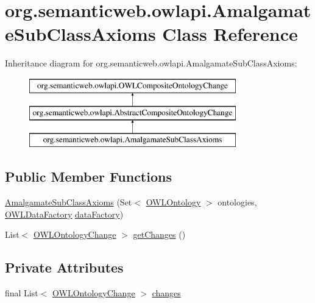 \hypertarget{classorg_1_1semanticweb_1_1owlapi_1_1_amalgamate_sub_class_axioms}{\section{org.\-semanticweb.\-owlapi.\-Amalgamate\-Sub\-Class\-Axioms Class Reference}
\label{classorg_1_1semanticweb_1_1owlapi_1_1_amalgamate_sub_class_axioms}
}
Inheritance diagram for org.\-semanticweb.\-owlapi.\-Amalgamate\-Sub\-Class\-Axioms\-:\begin{figure}[H]
\begin{center}
\leavevmode
\includegraphics[height=3.000000cm]{classorg_1_1semanticweb_1_1owlapi_1_1_amalgamate_sub_class_axioms}
\end{center}
\end{figure}
\subsection*{Public Member Functions}
\begin{DoxyCompactItemize}
\item 
\hyperlink{classorg_1_1semanticweb_1_1owlapi_1_1_amalgamate_sub_class_axioms_afe806c1aa6c20882c377a2e610063697}{Amalgamate\-Sub\-Class\-Axioms} (Set$<$ \hyperlink{interfaceorg_1_1semanticweb_1_1owlapi_1_1model_1_1_o_w_l_ontology}{O\-W\-L\-Ontology} $>$ ontologies, \hyperlink{interfaceorg_1_1semanticweb_1_1owlapi_1_1model_1_1_o_w_l_data_factory}{O\-W\-L\-Data\-Factory} \hyperlink{classorg_1_1semanticweb_1_1owlapi_1_1_abstract_composite_ontology_change_aebcfd0601543ebb5f72b1fe53a5352c9}{data\-Factory})
\item 
List$<$ \hyperlink{classorg_1_1semanticweb_1_1owlapi_1_1model_1_1_o_w_l_ontology_change}{O\-W\-L\-Ontology\-Change} $>$ \hyperlink{classorg_1_1semanticweb_1_1owlapi_1_1_amalgamate_sub_class_axioms_a5bd7f6c22488f7377c9819dbe6bba199}{get\-Changes} ()
\end{DoxyCompactItemize}
\subsection*{Private Attributes}
\begin{DoxyCompactItemize}
\item 
final List$<$ \hyperlink{classorg_1_1semanticweb_1_1owlapi_1_1model_1_1_o_w_l_ontology_change}{O\-W\-L\-Ontology\-Change} $>$ \hyperlink{classorg_1_1semanticweb_1_1owlapi_1_1_amalgamate_sub_class_axioms_a904a4e174b97384da16691dacd55d68a}{changes}
\end{DoxyCompactItemize}
